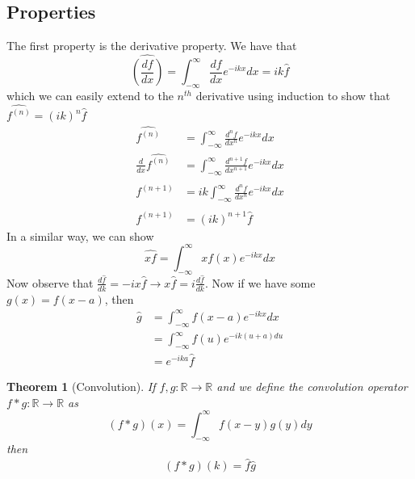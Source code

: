 \documentclass{article}
\newcommand{\R}{\mathbb{R}}
\newcommand{\od}[2]{\frac{d #1}{d #2}}
\newtheorem{theorem}{Theorem}[section]
\theoremstyle{definition}
\begin{document}
\subsection{Properties}
The first property is the derivative property. We have that 
\begin{equation*}
    \widehat{\left( \od{f}{x}\right)} = \int^\infty_{-\infty} \od{f}{x}e^{-ikx}dx = ik \hat f
\end{equation*}
which we can easily extend to the $n^{th}$ derivative using induction to show that $\widehat{f^{(n)}} = (ik)^n\hat f$
\begin{equation*}
    \begin{split}
        \widehat{f^{(n)}} &= \int^\infty_{-\infty}\od{^n f}{x^n}e^{-ikx}dx \\
        \od{}{x}  \widehat{f^{(n)}} &=\int^\infty_{-\infty}\od{^{n+1} f}{x^{n+1}}e^{-ikx}dx \\
        \widehat{f^{(n+1)}} &=ik\int^\infty_{-\infty}\od{^n f}{x^n}e^{-ikx}dx \\
        \widehat{f^{(n+1)}} &= (ik)^{n+1}\hat f
    \end{split}
\end{equation*}
In a similar way, we can show 
\begin{equation*}
    \widehat{xf} = \int^\infty_{-\infty} xf(x)e^{-ikx}dx 
\end{equation*}
Now observe that $\od{\hat f}{k} = -ix\hat f \rightarrow x\hat f = i\od{\hat f}{k}$. Now if we have some $g(x) =f(x-a)$, then 
\begin{equation*}
    \begin{split}
        \hat g &= \int^\infty_{-\infty} f(x-a) e^{-ikx}dx \\
        &= \int^\infty_{-\infty} f(u) e^{-ik(u+a)du}\\
        &= e^{-ika}\hat f
    \end{split}
\end{equation*}
\begin{theorem}[Convolution]
    If $f,g: \R \to \R$ and we define the convolution operator $f*g: \R \to \R$ as
    \begin{equation*}
        (f*g)(x) = \int^\infty_{-\infty} f(x-y)g(y)dy
    \end{equation*}
    then 
    \begin{equation*}
        \widehat{(f*g)}(k) = \hat f \hat g
    \end{equation*}
\end{theorem}
\end{document}
